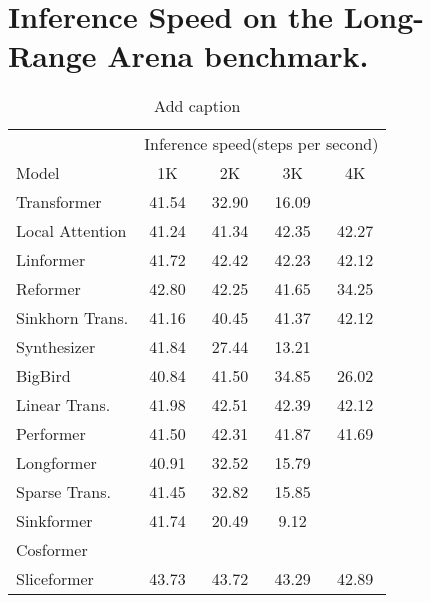 \section{Inference Speed on the Long-Range Arena benchmark.}\label{app:exp}
\begin{table}[htbp]
  \centering
  \caption{Add caption}
    \begin{tabular}{l|cccc}
    \hline
          & \multicolumn{4}{c}{Inference speed(steps per second)} \\
    Model & 1K    & 2K    & 3K    & 4K \\
    \hline
    Transformer & 41.54 & 32.90 & 16.09 &  \\
    \hline
    Local Attention & 41.24 & 41.34 & 42.35 & 42.27 \\
    Linformer & 41.72 & 42.42 & 42.23 & 42.12 \\
    Reformer & 42.80 & 42.25 & 41.65 & 34.25 \\
    Sinkhorn Trans. & 41.16 & 40.45 & 41.37 & 42.12 \\
    Synthesizer & 41.84 & 27.44 & 13.21 &  \\
    BigBird & 40.84 & 41.50 & 34.85 & 26.02 \\
    Linear Trans. & 41.98 & 42.51 & 42.39 & 42.12 \\
    Performer & 41.50 & 42.31 & 41.87 & 41.69 \\
    Longformer & 40.91 & 32.52 & 15.79 &  \\
    Sparse Trans. & 41.45 & 32.82 & 15.85 &  \\
    Sinkformer & 41.74 & 20.49 & 9.12  &  \\
    Cosformer &       &       &       &  \\
    \hline
    Sliceformer & 43.73 & 43.72 & 43.29 & 42.89 \\
    \hline
    \end{tabular}%
  \label{tab:addlabel}%
\end{table}%


